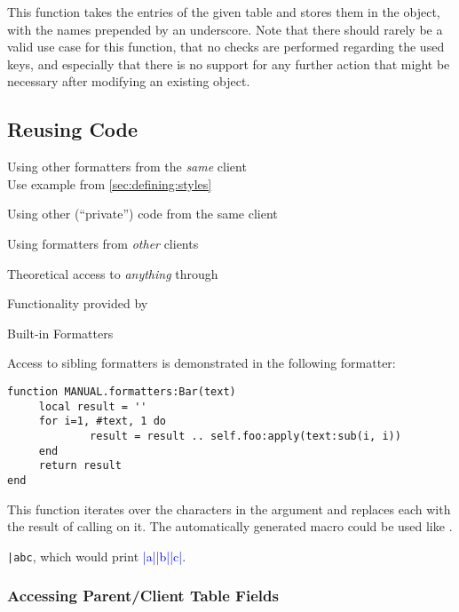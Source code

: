 \documentclass[12pt]{scrartcl}
\begin{document}
This function takes the entries of the given table and stores them in the
 object, with the names prepended by an underscore. Note that
there should rarely be a valid use case for this function, that no checks are
performed regarding the used keys, and especially that there is no support for
any further action that might be necessary after modifying an existing
 object.


\subsection{Reusing Code}
\label{sec:advanced:reusing-code}

\begin{itemize*}
\item Using other formatters from the \emph{same} client\\
Use  example from \vref{sec:defining:styles}
\item Using other (“private”) code from the same client
\item Using formatters from \emph{other} clients
\item Theoretical access to \emph{anything} through \luatemplates
\item Functionality provided by 
\label{sec:builtin-functions}
\item Built-in Formatters
\end{itemize*}


Access to sibling formatters is demonstrated in the following  formatter:

\begin{verbatim}
function MANUAL.formatters:Bar(text)
	 local result = ''
	 for i=1, #text, 1 do
			 result = result .. self.foo:apply(text:sub(i, i))
	 end
	 return result
end
\end{verbatim}

\noindent This function iterates over the characters in the 
argument and replaces each with the result of calling  on it.  The
automatically generated macro could be used like .

\texttt{\bar{abc}},
which would print \textcolor{blue}{|a||b||c|}.


\subsubsection{Accessing Parent/Client Table Fields}
\label{sec:advanced:reuse:parent-table}
\end{document}
